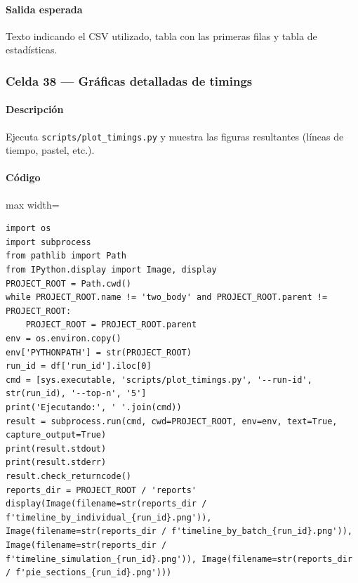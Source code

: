 \paragraph{Salida esperada} Texto indicando el CSV utilizado, tabla con las primeras filas y tabla de estadísticas.

\subsubsection*{Celda 38 — Gráficas detalladas de timings}
\paragraph{Descripción} Ejecuta \texttt{scripts/plot\_timings.py} y muestra las figuras resultantes (líneas de tiempo, pastel, etc.).
\paragraph{Código}
\par\smallskip
\begin{listing}[H]
\caption{Celda 38: generación y despliegue de gráficos de timings}
\begin{adjustbox}{max width=\textwidth}
\begin{minipage}{\textwidth}
\begin{verbatim}
import os
import subprocess
from pathlib import Path
from IPython.display import Image, display
PROJECT_ROOT = Path.cwd()
while PROJECT_ROOT.name != 'two_body' and PROJECT_ROOT.parent != PROJECT_ROOT:
    PROJECT_ROOT = PROJECT_ROOT.parent
env = os.environ.copy()
env['PYTHONPATH'] = str(PROJECT_ROOT)
run_id = df['run_id'].iloc[0]
cmd = [sys.executable, 'scripts/plot_timings.py', '--run-id', str(run_id), '--top-n', '5']
print('Ejecutando:', ' '.join(cmd))
result = subprocess.run(cmd, cwd=PROJECT_ROOT, env=env, text=True, capture_output=True)
print(result.stdout)
print(result.stderr)
result.check_returncode()
reports_dir = PROJECT_ROOT / 'reports'
display(Image(filename=str(reports_dir / f'timeline_by_individual_{run_id}.png')), Image(filename=str(reports_dir / f'timeline_by_batch_{run_id}.png')), Image(filename=str(reports_dir / f'timeline_simulation_{run_id}.png')), Image(filename=str(reports_dir / f'pie_sections_{run_id}.png')))
\end{verbatim}
\end{minipage}
\end{adjustbox}
\end{listing}
